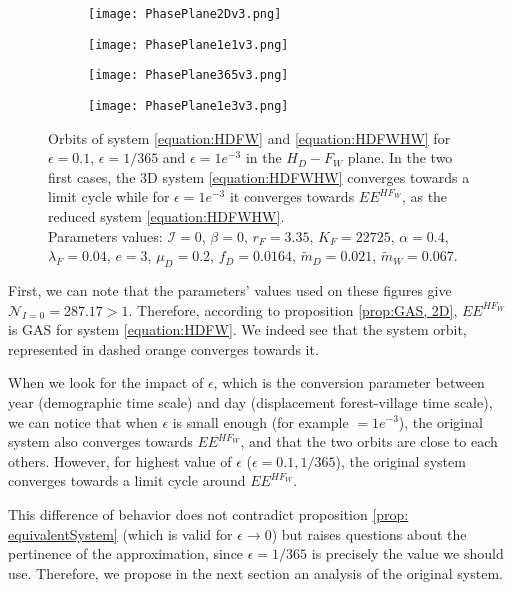 \documentclass{article}
\newcommand{\lfw}{\lambda_{F}}
\newcommand{\lfw}{\lambda_{F}}
\newcommand{\cI}{\mathcal{I}}
\newcommand{\mW}{\tilde{m}_W}
\newcommand{\mD}{\tilde{m}_D}
\begin{document}
\begin{figure}[!ht]
\centering
\begin{subfigure}{0.45\textwidth}
\centering
\texttt{[image: PhasePlane2Dv3.png]}
\caption{}
\end{subfigure}
\begin{subfigure}{0.45\textwidth}
\centering
\texttt{[image: PhasePlane1e1v3.png]}
\caption{}
\end{subfigure}
\begin{subfigure}{0.45\textwidth}
\centering
\texttt{[image: PhasePlane365v3.png]}
\caption{}
\end{subfigure}
\begin{subfigure}{0.45\textwidth}
\centering
\texttt{[image: PhasePlane1e3v3.png]}
\caption{}
\end{subfigure}
\caption{\centering Orbits of system \eqref{equation:HDFW} and \eqref{equation:HDFWHW} for $\epsilon = 0.1$, $\epsilon = 1/365$ and $\epsilon = 1e^{-3}$ in the $H_D - F_W$ plane. In the two first cases, the 3D system \eqref{equation:HDFWHW} converges towards a limit cycle while for $\epsilon = 1e^{-3}$ it converges towards $EE^{HF_W}$, as the reduced system \eqref{equation:HDFWHW}. \\
Parameters values: $\cI = 0$, $\beta = 0$, $r_F = 3.35$, $K_F = 22725$, $\alpha = 0.4$, $\lfw = 0.04$, $e = 3$, $\mu_D = 0.2$, $f_D = 0.0164$, $\mD = 0.021$, $\mW = 0.067$.}
\end{figure}

First, we can note that the parameters' values used on these figures give $\mathcal{N}_{I=0} = 287.17 > 1$. Therefore, according to proposition \ref{prop:GAS, 2D}, $EE^{HF_W}$ is GAS for system \eqref{equation:HDFW}. We indeed see that the system orbit, represented in dashed orange converges towards it. 

When we look for the impact of $\epsilon$, which is the conversion parameter between year (demographic time scale) and day (displacement forest-village time scale), we can notice that when $\epsilon$ is small enough (for example $= 1e^{-3}$), the original system also converges towards $EE^{HF_W}$, and that the two orbits are close to each others.
However, for highest value of $\epsilon$ ($\epsilon = 0.1, 1/365$), the original system converges towards a limit cycle around $EE^{HF_W}$.

This difference of behavior does not contradict proposition \eqref{prop: equivalentSystem} (which is valid for $\epsilon \rightarrow 0$) but raises questions about the pertinence of the approximation, since $\epsilon = 1/365$ is precisely the value we should use. Therefore, we propose in the next section an analysis of the original system.
\end{document}

